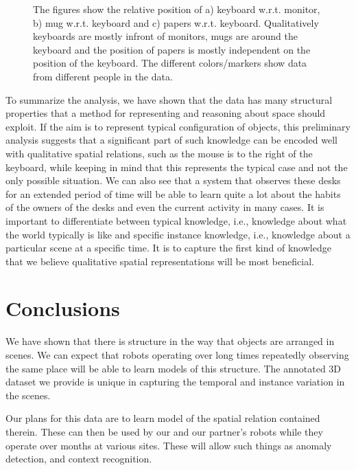 \documentclass[letterpaper, 10 pt, conference]{ieeeconf}  %
\begin{document}
\begin{figure}
\begin{center}
\end{center}
\caption{The figures show the relative position of a) keyboard w.r.t. monitor, b) mug w.r.t. keyboard and c) papers w.r.t. keyboard. Qualitatively keyboards are mostly infront of monitors, mugs are around the keyboard and the position of papers is mostly independent on the position of the keyboard. The different colors/markers show data from different people in the data.} 
\label{fig:scatter-rest}
\end{figure}

To summarize the analysis, we have shown that the data has many structural properties that a method for representing and reasoning about 
space should exploit. If the aim is to represent typical configuration of objects, this preliminary analysis suggests that a significant 
part of such knowledge can be encoded well with qualitative spatial relations, such as the mouse is to the right of the keyboard, while 
keeping in mind that this represents the typical case and not the only possible situation. We can also see that a system that observes these desks for 
an extended period of time will be able to learn quite a lot about the habits of the owners of the desks and even the current activity in 
many cases. It is important to differentiate between typical knowledge, i.e., knowledge about what the world typically is like and specific 
instance knowledge, i.e., knowledge about a particular scene at a specific time. It is to capture the first kind of knowledge that we 
believe  qualitative spatial representations will be most beneficial. 

\section{Conclusions}
\label{sec:Conclusions}

We have shown that there is structure in the way that objects are
arranged in scenes.  We can expect that robots operating over long
times repeatedly observing the same place will be able to learn models
of this structure.  The annotated 3D dataset we provide is unique in
capturing the temporal and instance variation in the scenes.

Our plans for this data are to learn model of the spatial relation
contained therein.  These can then be used by our and our partner's
robots while they operate over months at various sites.  These will
allow such things as anomaly detection, and context recognition.
\end{document}
